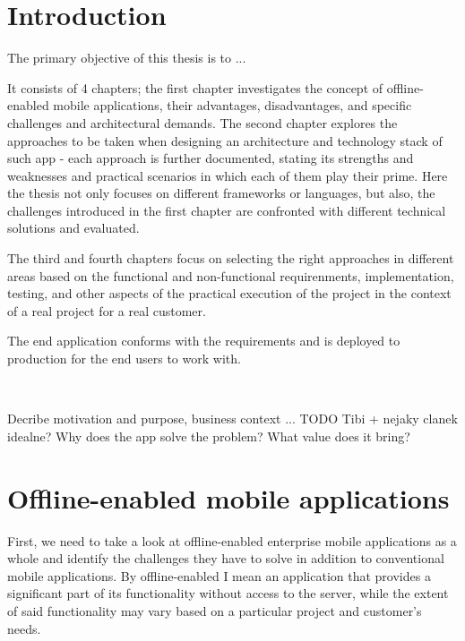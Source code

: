 \documentclass[
  digital,     %
  color,       %
  oneside,     %
  nosansbold,  %
  nocolorbold, %
  lof,         %
  lot,         %
]{fithesis4}
\begin{document}
\chapter*{Introduction}

The primary objective of this thesis is to ...

It consists of 4 chapters; the first chapter investigates the concept of offline-enabled mobile applications, their advantages, disadvantages, and specific challenges and architectural demands. The second chapter explores the approaches to be taken when designing an architecture and technology stack of such app - each approach is further documented, stating its strengths and weaknesses and practical scenarios in which each of them play their prime. Here the thesis not only focuses on different frameworks or languages, but also, the challenges introduced in the first chapter are confronted with different technical solutions and evaluated.

The third and fourth chapters focus on selecting the right approaches in different areas based on the functional and non-functional requirenments, implementation, testing, and other aspects of the practical execution of the project in the context of a real project for a real customer.

The end application conforms with the requirements and is deployed to production for the end users to work with.

~

Decribe motivation and purpose, business context ... TODO Tibi + nejaky clanek idealne?
Why does the app solve the problem? What value does it bring?

\chapter{Offline-enabled mobile applications}
First, we need to take a look at offline-enabled enterprise mobile applications as a whole and identify the challenges they have to solve in addition to conventional mobile applications. By offline-enabled I mean an application that provides a significant part of its functionality without access to the server, while the extent of said functionality may vary based on a particular project and customer's needs. 
\end{document}
